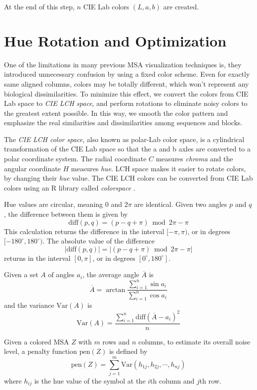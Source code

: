 At the end of this step, $n$ CIE Lab colors $(L, a, b)$ are created.

\section{Hue Rotation and Optimization}\label{sec:rotation}

One of the limitations in many previous MSA visualization techniques is, they introduced unnecessary confusion by using a fixed color scheme. Even for exactly same aligned columns, colors may be totally different, which won't represent any biological dissimilarities. To minimize this effect, we convert the colors from CIE Lab space to \emph{CIE LCH space}, and perform rotations to eliminate noisy colors to the greatest extent possible. In this way, we smooth the color pattern and emphasize the real similarities and dissimilarities among sequences and blocks.

The \emph{CIE LCH color space}, also known as polar-Lab color space, is a cylindrical transformation of the CIE Lab space so that the a and b axles are converted to a polar coordinate system. The radial coordinate $C$ measures \emph{chroma} and the angular coordinate $H$ measures \emph{hue}. LCH space makes it easier to rotate colors, by changing their \emph{hue} value. The CIE LCH colors can be converted from CIE Lab colors using an R library called \emph{colorspace} \cite{Ihaka:2009aa,Zeileis:2009aa}.

Hue values are circular, meaning $0$ and $2\pi$ are identical. Given two angles $p$ and $q$, the difference between them is given by $$\mathrm{diff}(p,q) = (p - q + \pi) \bmod 2\pi - \pi$$ This calculation returns the difference in the interval $[-\pi, \pi)$, or in degrees $[-180^{\circ}, 180^{\circ})$. The absolute value of the difference $$|\mathrm{diff}(p,q)| = |(p - q + \pi) \bmod 2\pi - \pi|$$ returns in the interval $[0, \pi]$, or in degrees $[0^{\circ}, 180^{\circ}]$.

Given a set $A$ of angles $a_i$, the average angle $\overline{A}$ is $$\overline{A}=\arctan{\frac{\displaystyle\sum_{i=1}^n \sin{a_i}}{\displaystyle\sum_{i=1}^n \cos{a_i}}}$$ and the variance $\mathrm{Var}(A)$ is $$\mathrm{Var}(A)=\frac{\displaystyle\sum_{i=1}^n \mathrm{diff}(\overline{A}-a_i)^2}{n}$$

Given a colored MSA $Z$ with $m$ rows and $n$ columns, to estimate its overall noise level, a penalty function $\mathrm{pen}(Z)$ is defined by $$\mathrm{pen}(Z)=\displaystyle\sum_{j=1}^m \mathrm{Var}(h_{1j},h_{2j},\cdots,h_{nj})$$ where $h_{ij}$ is the hue value of the symbol at the $i$th column and $j$th row.

